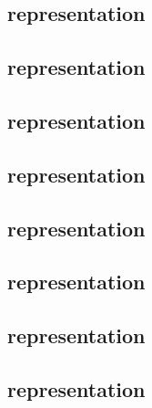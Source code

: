 \subsection{ representation}  \label{bls: lua: pointevaluation} 
\subsection{ representation}              \label{bls: lua: g1add}           
\subsection{ representation}              \label{bls: lua: g1msm}           
\subsection{ representation}              \label{bls: lua: g2add}           
\subsection{ representation}              \label{bls: lua: g2msm}           
\subsection{ representation}     \label{bls: lua: pairingcheck}    
\subsection{ representation}    \label{bls: lua: fptog1}          
\subsection{ representation}   \label{bls: lua: fp2tog2}         



